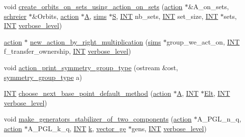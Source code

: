 \begin{DoxyCompactItemize}
\item 
void \mbox{\hyperlink{action__global_8_c_ac46a81a18b6269aa88c7434f22b0642b}{create\+\_\+orbits\+\_\+on\+\_\+sets\+\_\+using\+\_\+action\+\_\+on\+\_\+sets}} (\mbox{\hyperlink{classaction}{action}} $\ast$\&A\+\_\+on\+\_\+sets, \mbox{\hyperlink{classschreier}{schreier}} $\ast$\&Orbits, \mbox{\hyperlink{classaction}{action}} $\ast$\mbox{\hyperlink{simeon_8_c_a97833f04c3a9c008df5521a2fc291bb4}{A}}, \mbox{\hyperlink{classsims}{sims}} $\ast$\mbox{\hyperlink{simeon_8_c_adab47f8243f1b5a2c31df2535d6b37d0}{S}}, \mbox{\hyperlink{galois_8h_a09fddde158a3a20bd2dcadb609de11dc}{I\+NT}} nb\+\_\+sets, \mbox{\hyperlink{galois_8h_a09fddde158a3a20bd2dcadb609de11dc}{I\+NT}} set\+\_\+size, \mbox{\hyperlink{galois_8h_a09fddde158a3a20bd2dcadb609de11dc}{I\+NT}} $\ast$sets, \mbox{\hyperlink{galois_8h_a09fddde158a3a20bd2dcadb609de11dc}{I\+NT}} \mbox{\hyperlink{simeon_8_c_a818073fbcc2f439e7c56952f67386122}{verbose\+\_\+level}})
\item 
\mbox{\hyperlink{classaction}{action}} $\ast$ \mbox{\hyperlink{action__global_8_c_a46c2d6dc9b957db2383ed77bd20086ab}{new\+\_\+action\+\_\+by\+\_\+right\+\_\+multiplication}} (\mbox{\hyperlink{classsims}{sims}} $\ast$group\+\_\+we\+\_\+act\+\_\+on, \mbox{\hyperlink{galois_8h_a09fddde158a3a20bd2dcadb609de11dc}{I\+NT}} f\+\_\+transfer\+\_\+ownership, \mbox{\hyperlink{galois_8h_a09fddde158a3a20bd2dcadb609de11dc}{I\+NT}} \mbox{\hyperlink{simeon_8_c_a818073fbcc2f439e7c56952f67386122}{verbose\+\_\+level}})
\item 
void \mbox{\hyperlink{action__global_8_c_a03666b9440c4962148eba7905b9f843c}{action\+\_\+print\+\_\+symmetry\+\_\+group\+\_\+type}} (ostream \&ost, \mbox{\hyperlink{action_8h_a609fcdec33cc2d16c6c067d07931cba9}{symmetry\+\_\+group\+\_\+type}} a)
\item 
\mbox{\hyperlink{galois_8h_a09fddde158a3a20bd2dcadb609de11dc}{I\+NT}} \mbox{\hyperlink{action__global_8_c_aa8a0dd82f9ba29cb6f07b63528ff3763}{choose\+\_\+next\+\_\+base\+\_\+point\+\_\+default\+\_\+method}} (\mbox{\hyperlink{classaction}{action}} $\ast$\mbox{\hyperlink{simeon_8_c_a97833f04c3a9c008df5521a2fc291bb4}{A}}, \mbox{\hyperlink{galois_8h_a09fddde158a3a20bd2dcadb609de11dc}{I\+NT}} $\ast$\mbox{\hyperlink{simeon_8_c_aec1406935bdb1fee3561fcb840964100}{Elt}}, \mbox{\hyperlink{galois_8h_a09fddde158a3a20bd2dcadb609de11dc}{I\+NT}} \mbox{\hyperlink{simeon_8_c_a818073fbcc2f439e7c56952f67386122}{verbose\+\_\+level}})
\item 
void \mbox{\hyperlink{action__global_8_c_af4fb463f6162ded3a77b674093f1e0bd}{make\+\_\+generators\+\_\+stabilizer\+\_\+of\+\_\+two\+\_\+components}} (\mbox{\hyperlink{classaction}{action}} $\ast$A\+\_\+\+P\+G\+L\+\_\+n\+\_\+q, \mbox{\hyperlink{classaction}{action}} $\ast$A\+\_\+\+P\+G\+L\+\_\+k\+\_\+q, \mbox{\hyperlink{galois_8h_a09fddde158a3a20bd2dcadb609de11dc}{I\+NT}} \mbox{\hyperlink{simeon_8_c_a43fa990200c3ddd47c35f151bd4d66bf}{k}}, \mbox{\hyperlink{classvector__ge}{vector\+\_\+ge}} $\ast$gens, \mbox{\hyperlink{galois_8h_a09fddde158a3a20bd2dcadb609de11dc}{I\+NT}} \mbox{\hyperlink{simeon_8_c_a818073fbcc2f439e7c56952f67386122}{verbose\+\_\+level}})

\end{DoxyCompactItemize}
